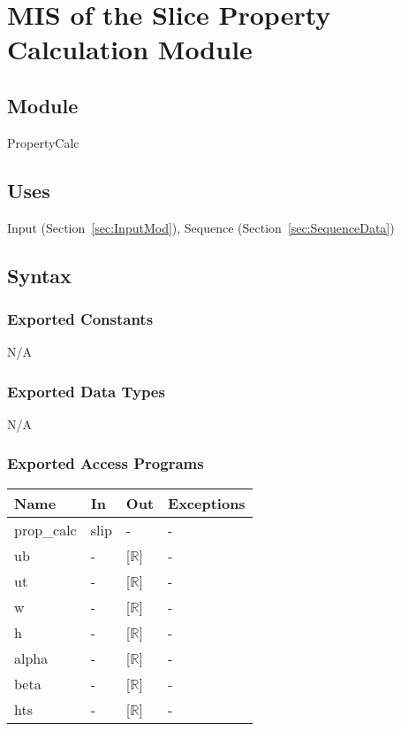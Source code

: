 \documentclass[12pt, titlepage]{article}
\begin{document}
\section{MIS of the Slice Property Calculation Module} \label{sec:PropSortMod}

\subsection{Module} 
PropertyCalc

\subsection{Uses}
Input (Section~\ref{sec:InputMod}), Sequence (Section~\ref{sec:SequenceData})

\subsection{Syntax}

\subsubsection{Exported Constants}
N/A

\subsubsection{Exported Data Types}
N/A

\subsubsection{Exported Access Programs}

\begin{center}
	\renewcommand*{\arraystretch}{1.5}
	\begin{tabular} {p{}  p{}  p{} 
			p{} } \hline 
		\textbf{Name} & \textbf{In} & \textbf{Out} & \textbf{Exceptions} \\ 
		\hline

  prop\_calc & slip & - & - \\ 
  ub & - & [$\mathbb{R}$] & - \\
  ut & - & [$\mathbb{R}$] & - \\
  w & - & [$\mathbb{R}$] & - \\
  h & - & [$\mathbb{R}$] & - \\
  alpha & - & [$\mathbb{R}$] & - \\
  beta & - & [$\mathbb{R}$] & - \\
  hts & - & [$\mathbb{R}$] & - \\ \hline
\end{tabular}
\end{center}
\end{document}
